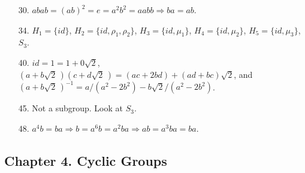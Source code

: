 {\begin{itemize}
\item[30.]
$abab = (ab)^2 = e = a^2 b^2 = aabb\Rightarrow  ba = ab$.
 
\item[34.]
$H_1 = \{ id \}$, $H_2 = \{ id, \rho_1, \rho_2  \}$, $H_3 = \{ id,
\mu_1 \}$, $H_4 = \{ id, \mu_2 \}$, $H_5 = \{ id, \mu_3 \}$, $S_3$.
 
\item[40.]
$id = 1 = 1 + 0 \sqrt{2}$, $(a + b \sqrt{2}\, )(c + d \sqrt{2}\, ) = 
(ac + 2bd) + (ad + bc)\sqrt{2}$, and $(a + b \sqrt{2}\, )^{-1} = a/(a^2
-2b^2) - b\sqrt{2}/(a^2 - 2 b^2)$.
 
\item[45.]
Not a subgroup. Look at $S_3$.
 
\item[48.]
$a^4b =ba \Rightarrow b = a^6 b = a^2 b a \Rightarrow ab = a^3 b a =
ba$. 
 
\end{itemize}
}
 
\subsection*{Chapter 4. Cyclic Groups}
 
